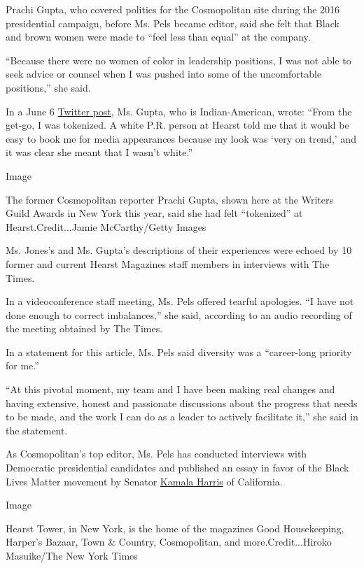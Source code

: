 Prachi Gupta, who covered politics for the Cosmopolitan site during the
2016 presidential campaign, before Ms. Pels became editor, said she felt
that Black and brown women were made to ``feel less than equal'' at the
company.

``Because there were no women of color in leadership positions, I was
not able to seek advice or counsel when I was pushed into some of the
uncomfortable positions,'' she said.

In a June 6
\href{https://twitter.com/prachigu/status/1269362844522426371?s=20}{Twitter
post}, Ms. Gupta, who is Indian-American, wrote: ``From the get-go, I
was tokenized. A white P.R. person at Hearst told me that it would be
easy to book me for media appearances because my look was `very on
trend,' and it was clear she meant that I wasn't white.''

Image

The former Cosmopolitan reporter Prachi Gupta, shown here at the Writers
Guild Awards in New York this year, said she had felt ``tokenized'' at
Hearst.Credit...Jamie McCarthy/Getty Images

Ms. Jones's and Ms. Gupta's descriptions of their experiences were
echoed by 10 former and current Hearst Magazines staff members in
interviews with The Times.

In a videoconference staff meeting, Ms. Pels offered tearful apologies.
``I have not done enough to correct imbalances,'' she said, according to
an audio recording of the meeting obtained by The Times.

In a statement for this article, Ms. Pels said diversity was a
``career-long priority for me.''

``At this pivotal moment, my team and I have been making real changes
and having extensive, honest and passionate discussions about the
progress that needs to be made, and the work I can do as a leader to
actively facilitate it,'' she said in the statement.

As Cosmopolitan's top editor, Ms. Pels has conducted interviews with
Democratic presidential candidates and published an essay in favor of
the Black Lives Matter movement by Senator
\href{https://www.cosmopolitan.com/politics/a32766156/kamala-harris-black-lives-matter-protests/}{Kamala
Harris} of California.

Image

Hearst Tower, in New York, is the home of the magazines Good
Housekeeping, Harper's Bazaar, Town \& Country, Cosmopolitan, and
more.Credit...Hiroko Masuike/The New York Times

